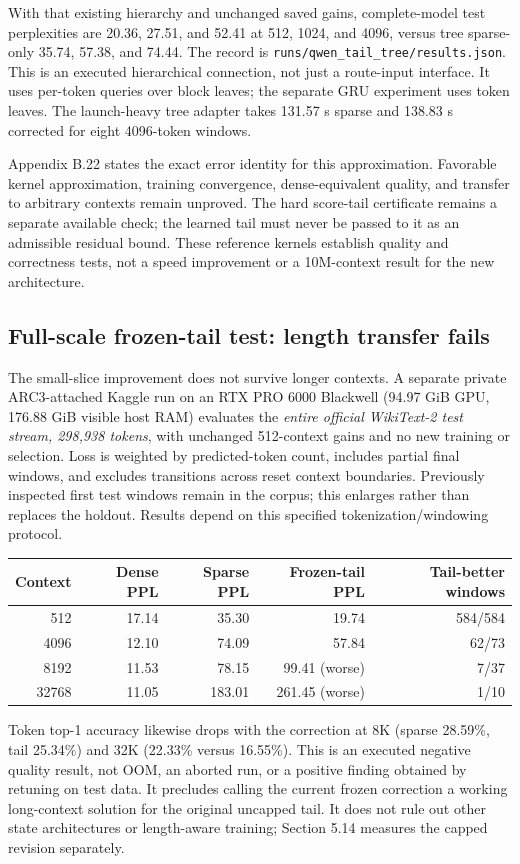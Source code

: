 \documentclass[11pt]{article}
\numberwithin{equation}{section}
\begin{document}
With that existing hierarchy and unchanged saved gains, complete-model test perplexities are 20.36, 27.51,
and 52.41 at 512, 1024, and 4096, versus tree sparse-only 35.74, 57.38, and 74.44. The record is
\texttt{runs/qwen\_tail\_tree/results.json}. This is an executed hierarchical connection, not just a route-input
interface. It uses per-token queries over block leaves; the separate GRU experiment uses token leaves.
The launch-heavy tree adapter takes 131.57 s sparse and 138.83 s corrected for eight 4096-token windows.

Appendix B.22 states the exact error identity for this approximation. Favorable kernel approximation,
training convergence, dense-equivalent quality, and transfer to arbitrary contexts remain unproved. The hard
score-tail certificate remains a separate available check; the learned tail must never be passed to it as an
admissible residual bound. These reference kernels establish quality and correctness tests, not a speed
improvement or a 10M-context result for the new architecture.

\subsection{Full-scale frozen-tail test: length transfer fails}

The small-slice improvement does not survive longer contexts. A separate private ARC3-attached Kaggle run
on an RTX PRO 6000 Blackwell (94.97 GiB GPU, 176.88 GiB visible host RAM) evaluates the \emph{entire official
WikiText-2 test stream, 298,938 tokens}, with unchanged 512-context gains and no new training or selection.
Loss is weighted by predicted-token count, includes partial final windows, and excludes transitions across
reset context boundaries. Previously inspected first test windows remain in the corpus; this enlarges
rather than replaces the holdout. Results depend on this specified tokenization/windowing protocol.
\begin{center}\small
\begin{tabular}{rrrrr}\toprule
Context & Dense PPL & Sparse PPL & Frozen-tail PPL & Tail-better windows\\\midrule
512 & 17.14 & 35.30 & 19.74 & 584/584\\
4096 & 12.10 & 74.09 & 57.84 & 62/73\\
8192 & 11.53 & 78.15 & 99.41 (worse) & 7/37\\
32768 & 11.05 & 183.01 & 261.45 (worse) & 1/10\\\bottomrule
\end{tabular}
\end{center}
Token top-1 accuracy likewise drops with the correction at 8K (sparse 28.59\%, tail 25.34\%) and 32K
(22.33\% versus 16.55\%). This is an executed negative quality result, not OOM, an aborted run, or a
positive finding obtained by retuning on test data. It precludes calling the current frozen correction a
working long-context solution for the original uncapped tail. It does not rule out other state architectures
or length-aware training; Section 5.14 measures the capped revision separately.
\end{document}

